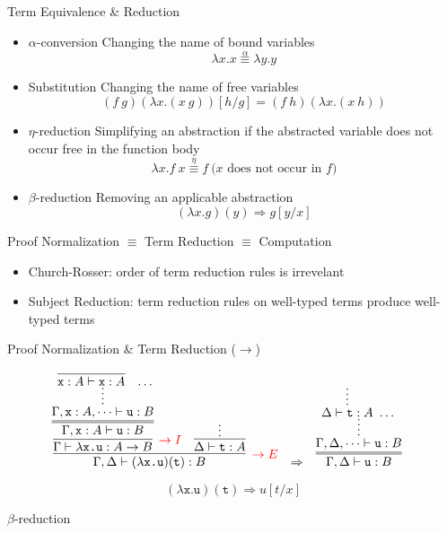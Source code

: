 \documentclass{beamer}
\newcommand{\term}[1]{\texttt{#1}}
\begin{document}
\begin{frame}{Term Equivalence \& Reduction}
	\small 
	
	\begin{itemize}
		\item \alert{$\alpha$-conversion} Changing the name of bound variables
		\[
			\lambda x.x \stackrel{\alpha}{\equiv} \lambda y.y
		\]
		\item \alert{Substitution} Changing the name of free variables
		\[
			(f\  g)(\lambda x.(x \ g))[h/g] = (f\ h)(\lambda x.(x \ h))	
		\]
		\item \alert{$\eta$-reduction} Simplifying an abstraction if the abstracted variable does not occur free in the function body
		\[
			\lambda x.f \ x \stackrel{\eta}{\equiv} f \ \text{($x$ does not occur in $f$)}
		\]
		\item \alert{$\beta$-reduction} Removing an applicable abstraction
		\[
			(\lambda x.g)(y) \Longrightarrow g[y/x]
		\]
	\end{itemize}
	\pause
	
	\begin{block}{Proof Normalization $\equiv$ Term Reduction $\equiv$ Computation}
		\begin{itemize}
			\item Church-Rosser: order of term reduction rules is irrevelant
			\item Subject Reduction: term reduction rules on well-typed terms produce well-typed terms
		\end{itemize}
	\end{block}
\end{frame}


\begin{frame}{Proof Normalization \& Term Reduction ($\to$)}
	\small 
	
	\[
		\begin{array}[t]{@{}ccc}
			\infer[\textcolor{red}{\to E}]{\Gamma, \Delta \vdash (\lambda\term{x.u})(\term{t}): B}{
				\infer[\textcolor{red}{\to I}]{\Gamma \vdash \lambda\term{x.u}: A \to B}{
					\infer=[]{\Gamma, \term{x}: A \vdash \term{u}: B}{
						\infer*[]{\Gamma, \term{x}: A, \dots \vdash \term{u}: B}{
							\infer[]{\term{x}: A \vdash \term{x}: A}{}
							\
							\dots
						}
					}
				}
				&
				\infer[]{\Delta \vdash \term{t}: A}{\vdots}
			}		
			&
			\Rightarrow
			&
			\infer=[]{\Gamma, \Delta \vdash \term{u}: B}{
				\infer*[]{\Gamma, \Delta, \dots \vdash \term{u}: B}{
					\infer*[]{\Delta \vdash \term{t}: A}{}
					\
					\dots
				}
			}
		\end{array}
	\]	
	
	\alert{
	\[
		(\lambda\term{x.u})(\term{t}) \Longrightarrow u[t/x]
	\]
	}
	\begin{flushright}
		$\beta$-reduction
	\end{flushright}

\end{frame}
\end{document}
